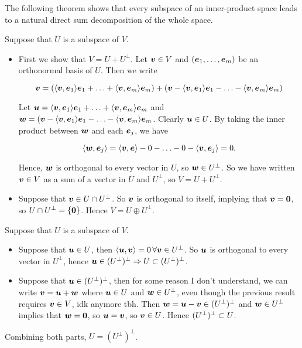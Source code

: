 \documentclass{report}
\begin{document}
	The following theorem shows that every subspace of an inner-product space leads to a natural direct sum decomposition of the whole space.
	\begin{myproof}
		Suppose that $U$ is a subspace of $V$. 
		\begin{itemize}
			\item First we show that $V=U+U^{\perp}$. Let $\boldsymbol{v}\in V$ and $(\boldsymbol{e}_1,\ldots,\boldsymbol{e}_m)$ be an orthonormal basis of $U$. Then we write 
			
			$$\boldsymbol{v}=(\langle\boldsymbol{v},\boldsymbol{e}_1\rangle\boldsymbol{e}_1+\ldots+\langle\boldsymbol{v},\boldsymbol{e}_m\rangle\boldsymbol{e}_m)+(\boldsymbol{v}-\langle\boldsymbol{v},\boldsymbol{e}_1\rangle\boldsymbol{e}_1-\ldots-\langle\boldsymbol{v},\boldsymbol{e}_m\rangle\boldsymbol{e}_m)$$
			
			Let $\boldsymbol{u}=\langle\boldsymbol{v},\boldsymbol{e}_1\rangle\boldsymbol{e}_1+\ldots+\langle\boldsymbol{v},\boldsymbol{e}_m\rangle\boldsymbol{e}_m$ and $\boldsymbol{w}=(\boldsymbol{v}-\langle\boldsymbol{v},\boldsymbol{e}_1\rangle\boldsymbol{e}_1-\ldots-\langle\boldsymbol{v},\boldsymbol{e}_m\rangle\boldsymbol{e}_m$. Clearly $\boldsymbol{u}\in U$. By taking the inner product between $\boldsymbol{w}$ and each $\boldsymbol{e}_j$, we have
			
			$$\langle\boldsymbol{w},\boldsymbol{e}_j\rangle=\langle\boldsymbol{v},\boldsymbol{e}\rangle-0-\ldots-0-\langle\boldsymbol{v},\boldsymbol{e}_j\rangle=0.$$
			
			Hence, $\boldsymbol{w}$ is orthogonal to every vector in $U$, so $\boldsymbol{w}\in U^{\perp}$. So we have written $\boldsymbol{v}\in V$ as a sum of a vector in $U$ and $U^{\perp}$, so $V=U+U^{\perp}$.
			\item Suppose that $\boldsymbol{v}\in U\cap U^{\perp}$. So $\boldsymbol{v}$ is orthogonal to itself, implying that $\boldsymbol{v}=\textbf{0}$, so $U\cap U^{\perp}=\{\textbf{0}\}$. Hence $V=U\oplus U^{\perp}$.
		\end{itemize}
	\end{myproof}
	\begin{myproof}
		Suppose that $U$ is a subspace of $V$. 
		\begin{itemize}
			\item Suppose that $\boldsymbol{u}\in U$, then $\langle\boldsymbol{u},\boldsymbol{v}\rangle=0\,\forall \boldsymbol{v}\in U^{\perp}$. So $\boldsymbol{u}$ is orthogonal to every vector in $U^{\perp}$, hence $\boldsymbol{u}\in(U^{\perp})^{\perp}\Rightarrow U\subset(U^{\perp})^{\perp}$.
			\item Suppose that $\boldsymbol{u}\in (U^{\perp})^{\perp}$, then for some reason I don't understand, we can write $\boldsymbol{v}=\boldsymbol{u}+\boldsymbol{w}$ where $\boldsymbol{u}\in U$ and $\boldsymbol{w}\in U^{\perp}$, even though the previous result requires $\boldsymbol{v}\in V$, idk anymore tbh. Then $\boldsymbol{w}=\boldsymbol{u}-\boldsymbol{v}\in (U^{\perp})^{\perp}$ and $\boldsymbol{w}\in U^{\perp}$ implies that $\boldsymbol{w}=\textbf{0}$, so $\boldsymbol{u}=\boldsymbol{v}$, so $\boldsymbol{v}\in U$. Hence $(U^{\perp})^{\perp}\subset U$.
		\end{itemize}
		Combining both parts, $U=(U^{\perp})^{\perp}$.
	\end{myproof}
\end{document}
